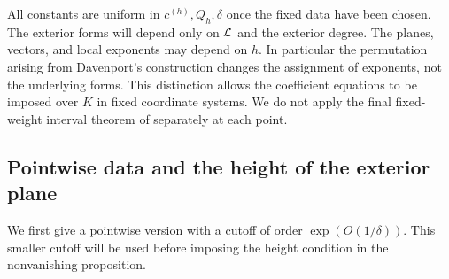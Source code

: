 \documentclass[11pt]{article}
\numberwithin{equation}{section}
\theoremstyle{remark}\newtheorem{remark}[theorem]{Remark}
\begin{document}
All constants are uniform in $c^{(h)},Q_h,\delta$ once the fixed data
have been chosen. The exterior forms will depend only on $\mathcal L$ and
the exterior degree. The planes, vectors, and local exponents may
depend on $h$. In particular the permutation arising from Davenport's
construction changes the assignment of exponents, not the underlying
forms. This distinction allows the coefficient equations to be imposed
over $K$ in fixed coordinate systems. We do not apply the final
fixed-weight interval theorem of \cite{EF13} separately at each point.

\subsection{Pointwise data and the height of the exterior plane}
We first give a pointwise version with a cutoff of order
$\exp(O(1/\delta))$. This smaller cutoff will be used before imposing
the height condition in the nonvanishing proposition.
\end{document}
